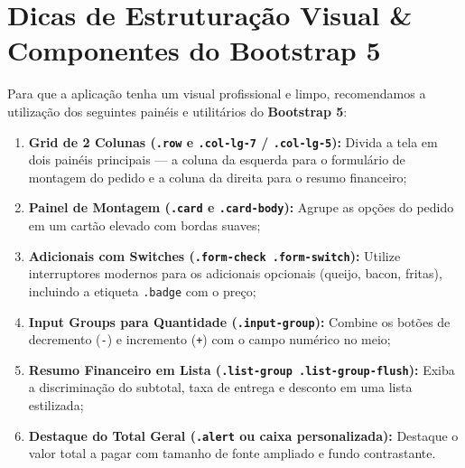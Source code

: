 

\section{Dicas de Estruturação Visual \& Componentes do Bootstrap 5}\label{sec:m2a}

Para que a aplicação tenha um visual profissional e limpo, recomendamos a utilização dos seguintes painéis e utilitários do \textbf{Bootstrap 5}:

\begin{enumerate}
\item \textbf{Grid de 2 Colunas (\texttt{.row} e \texttt{.col-lg-7} / \texttt{.col-lg-5}):} Divida a tela em dois painéis principais — a coluna da esquerda para o formulário de montagem do pedido e a coluna da direita para o resumo financeiro;
\item \textbf{Painel de Montagem (\texttt{.card} e \texttt{.card-body}):} Agrupe as opções do pedido em um cartão elevado com bordas suaves;
\item \textbf{Adicionais com Switches (\texttt{.form-check .form-switch}):} Utilize interruptores modernos para os adicionais opcionais (queijo, bacon, fritas), incluindo a etiqueta \texttt{.badge} com o preço;
\item \textbf{Input Groups para Quantidade (\texttt{.input-group}):} Combine os botões de decremento (\texttt{-}) e incremento (\texttt{+}) com o campo numérico no meio;
\item \textbf{Resumo Financeiro em Lista (\texttt{.list-group .list-group-flush}):} Exiba a discriminação do subtotal, taxa de entrega e desconto em uma lista estilizada;
\item \textbf{Destaque do Total Geral (\texttt{.alert} ou caixa personalizada):} Destaque o valor total a pagar com tamanho de fonte ampliado e fundo contrastante.
\end{enumerate}


